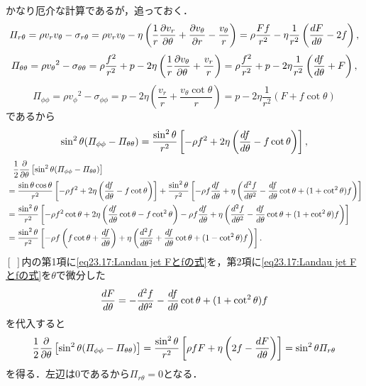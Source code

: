 \begin{details}
かなり厄介な計算であるが，追っておく．
\[
    \varPi_{r\theta} = \rho v_r v_\theta - \sigma_{r\theta}
    = \rho v_r v_\theta - \eta \left( \frac{1}{r} \pdv{v_r}{\theta} + \pdv{v_\theta}{r} - \frac{v_\theta}{r} \right)
    = \rho \frac{Ff}{r^2} - \eta\frac{1}{r^2} \left( \dv{F}{\theta} - 2f \right),
\]
\[
    \varPi_{\theta\theta} = \rho {v_\theta}^2 - \sigma_{\theta\theta}
    = \rho \frac{f^2}{r^2} + p - 2\eta \left( \frac{1}{r} \pdv{{v_\theta}}{\theta} + \frac{v_r}{r} \right)
    = \rho \frac{f^2}{r^2} + p - 2\eta \frac{1}{r^2} \left( \dv{f}{\theta} + F \right),
\]
\[
    \varPi_{\phi\phi} = \rho {v_\phi}^2 - \sigma_{\phi\phi}
    = p - 2\eta \left( \frac{v_r}{r} + \frac{v_\theta \cot\theta}{r} \right)
    = p - 2\eta \frac{1}{r^2} \left( F + f\cot\theta \right)
\]
であるから
\[
    \sin^2\theta (\varPi_{\phi\phi} - \varPi_{\theta\theta})
    = \frac{\sin^2\theta}{r^2} \left[ -\rho f^2 + 2\eta \left( \dv{f}{\theta} - f \cot\theta \right) \right],
\]
\begin{align*}
    &\phantom{=} \frac{1}{2} \pdv{\theta} \left[ \sin^2\theta (\varPi_{\phi\phi} - \varPi_{\theta\theta}) \right] \\
    &= \frac{\sin\theta\cos\theta}{r^2} \left[ -\rho f^2 + 2\eta \left( \dv{f}{\theta} - f \cot\theta \right) \right]
    + \frac{\sin^2\theta}{r^2} \left[ -\rho f \dv{f}{\theta} + \eta \left( \dv[2]{f}{\theta} - \dv{f}{\theta}\cot\theta + (1+\cot^2\theta) f\right) \right] \\
    &= \frac{\sin^2\theta}{r^2} \left[ -\rho f^2 \cot\theta + 2\eta \left( \dv{f}{\theta} \cot\theta - f \cot^2\theta \right) 
    - \rho f \dv{f}{\theta} + \eta \left( \dv[2]{f}{\theta} - \dv{f}{\theta}\cot\theta + (1+\cot^2\theta) f\right) \right] \\
    &= \frac{\sin^2\theta}{r^2} \left[ -\rho f \left( f \cot\theta + \dv{f}{\theta} \right) 
    + \eta \left( \dv[2]{f}{\theta} + \dv{f}{\theta}\cot\theta + (1-\cot^2\theta) f\right) \right].
\end{align*}
$[\;]$内の第1項に\eqref{eq23.17:Landau jet Fとfの式}を，第2項に\eqref{eq23.17:Landau jet Fとfの式}を$\theta$で微分した
\[
    \dv{F}{\theta} = - \dv[2]{f}{\theta} - \dv{f}{\theta} \cot\theta + (1+\cot^2\theta) f
\]
を代入すると
\[
    \frac{1}{2} \pdv{\theta} \left[ \sin^2\theta (\varPi_{\phi\phi} - \varPi_{\theta\theta}) \right]
    = \frac{\sin^2\theta}{r^2} \left[ \rho fF + \eta \left( 2f - \dv{F}{\theta} \right) \right]
    = \sin^2\theta \varPi_{r\theta}
\]
を得る．左辺は0であるから$\varPi_{r\theta}=0$となる．

\end{details}

